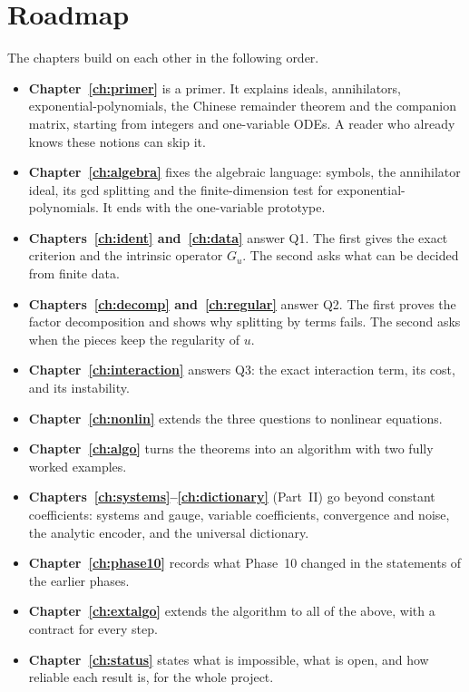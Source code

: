 \section{Roadmap}

The chapters build on each other in the following order.
\begin{itemize}
\item \textbf{Chapter~\ref{ch:primer}} is a primer. It explains ideals, annihilators, exponential-polynomials, the Chinese remainder theorem and the companion matrix, starting from integers and one-variable ODEs. A reader who already knows these notions can skip it.
\item \textbf{Chapter~\ref{ch:algebra}} fixes the algebraic language: symbols, the annihilator ideal, its gcd splitting and the finite-dimension test for exponential-polynomials. It ends with the one-variable prototype.
\item \textbf{Chapters~\ref{ch:ident} and~\ref{ch:data}} answer Q1. The first gives the exact criterion and the intrinsic operator $G_u$. The second asks what can be decided from finite data.
\item \textbf{Chapters~\ref{ch:decomp} and~\ref{ch:regular}} answer Q2. The first proves the factor decomposition and shows why splitting by terms fails. The second asks when the pieces keep the regularity of $u$.
\item \textbf{Chapter~\ref{ch:interaction}} answers Q3: the exact interaction term, its cost, and its instability.
\item \textbf{Chapter~\ref{ch:nonlin}} extends the three questions to nonlinear equations.
\item \textbf{Chapter~\ref{ch:algo}} turns the theorems into an algorithm with two fully worked examples.
\item \textbf{Chapters~\ref{ch:systems}--\ref{ch:dictionary}} (Part~II) go beyond constant coefficients: systems and gauge, variable coefficients, convergence and noise, the analytic encoder, and the universal dictionary.
\item \textbf{Chapter~\ref{ch:phase10}} records what Phase~10 changed in the statements of the earlier phases.
\item \textbf{Chapter~\ref{ch:extalgo}} extends the algorithm to all of the above, with a contract for every step.
\item \textbf{Chapter~\ref{ch:status}} states what is impossible, what is open, and how reliable each result is, for the whole project.
\end{itemize}
